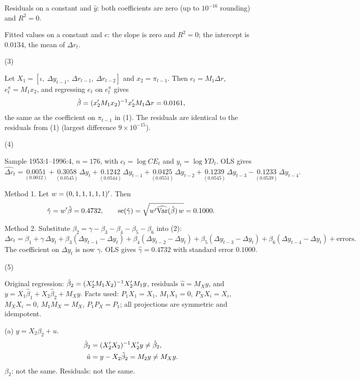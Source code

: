\documentclass[11pt]{article}
\renewcommand{\question}[1]{\par\needspace{4\baselineskip}\medskip\noindent #1\par\nobreak\smallskip}
\begin{document}
Residuals on a constant and $\hat y$: both coefficients are zero (up to $10^{-16}$ rounding) and $R^{2} = 0$.

Fitted values on a constant and $e$: the slope is zero and $R^{2} = 0$; the intercept is $0.0134$, the mean of $\Delta r_{t}$.

\question{(3)}
Let $X_{1} = [\iota,\ \Delta y_{t-1},\ \Delta r_{t-1},\ \Delta r_{t-2}]$ and $x_{2} = \pi_{t-1}$.
Then $e_{t} = M_{1}\Delta r$, $e^{\pi}_{t} = M_{1}x_{2}$, and regressing $e_{t}$ on $e^{\pi}_{t}$ gives
\[
  \hat\beta = (x_{2}^{\prime} M_{1}x_{2})^{-1}x_{2}^{\prime} M_{1}\Delta r = 0.0161,
\]
the same as the coefficient on $\pi_{t-1}$ in (1).
The residuals are identical to the residuals from (1) (largest difference $9\times10^{-15}$).

\question{(4)}
Sample 1953:1--1996:4, $n = 176$, with $c_{t} = \log CE_{t}$ and $y_{t} = \log YD_{t}$. OLS gives
\[
  \widehat{\Delta c}_{t} = \underset{(0.0012)}{0.0051}
  + \underset{(0.0545)}{0.3058}\,\Delta y_{t}
  + \underset{(0.0544)}{0.1242}\,\Delta y_{t-1}
  + \underset{(0.0551)}{0.0425}\,\Delta y_{t-2}
  + \underset{(0.0545)}{0.1239}\,\Delta y_{t-3}
  - \underset{(0.0539)}{0.1233}\,\Delta y_{t-4}.
\]

Method 1. Let $w = (0,1,1,1,1,1)^{\prime}$. Then
\[
  \hat\gamma = w^{\prime}\hat\beta = 0.4732, \qquad
  \operatorname{se}(\hat\gamma) = \sqrt{w^{\prime} \widehat{\operatorname{Var}}(\hat\beta)\,w} = 0.1000.
\]

Method 2. Substitute $\beta_{2} = \gamma - \beta_{3} - \beta_{4} - \beta_{5} - \beta_{6}$ into (2):
\[
  \Delta c_{t} = \beta_{1} + \gamma\,\Delta y_{t}
  + \beta_{3}(\Delta y_{t-1} - \Delta y_{t})
  + \beta_{4}(\Delta y_{t-2} - \Delta y_{t})
  + \beta_{5}(\Delta y_{t-3} - \Delta y_{t})
  + \beta_{6}(\Delta y_{t-4} - \Delta y_{t}) + \text{errors}.
\]
The coefficient on $\Delta y_{t}$ is now $\gamma$. OLS gives $\hat\gamma = 0.4732$ with standard error $0.1000$.

\question{(5)}
Original regression: $\hat\beta_{2} = (X_{2}^{\prime} M_{1}X_{2})^{-1}X_{2}^{\prime} M_{1}y$, residuals $\hat u = M_{X}y$,
and $y = X_{1}\hat\beta_{1} + X_{2}\hat\beta_{2} + M_{X}y$.
Facts used: $P_{1}X_{1} = X_{1}$, $M_{1}X_{1} = 0$, $P_{X}X_{i} = X_{i}$, $M_{X}X_{i} = 0$, $M_{1}M_{X} = M_{X}$, $P_{1}P_{X} = P_{1}$;
all projections are symmetric and idempotent.

\medskip\noindent(a) $y = X_{2}\beta_{2} + u$.
\begin{align*}
  \tilde\beta_{2} &= (X_{2}^{\prime} X_{2})^{-1}X_{2}^{\prime} y \neq \hat\beta_{2},\\
  \tilde u &= y - X_{2}\tilde\beta_{2} = M_{2}y \neq M_{X}y.
\end{align*}
$\beta_{2}$: not the same. Residuals: not the same.
\end{document}
